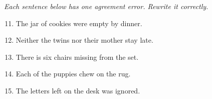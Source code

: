 \documentclass[11pt]{article}
\begin{document}
\vspace{6pt}
\noindent\textit{Each sentence below has one agreement error. Rewrite it correctly.}
\begin{enumerate}\setcounter{enumi}{10}
  \item The jar of cookies were empty by dinner.
  \vspace{0.55in}
  \item Neither the twins nor their mother stay late.
  \vspace{0.55in}
  \item There is six chairs missing from the set.
  \vspace{0.55in}
  \item Each of the puppies chew on the rug.
  \vspace{0.55in}
  \item The letters left on the desk was ignored.
  \vspace{0.55in}
\end{enumerate}
\end{document}
